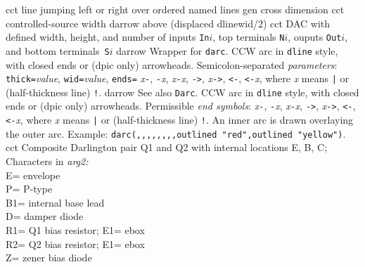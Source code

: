  {cct}%
  {line jumping left or right over ordered named lines}%
%
  {gen}%
  {cross dimension}%
%
  {cct}%
  {controlled-source width}%
%
%
  {darrow}%
  {above (displaced dlinewid/2)}%
%
  {cct}%
  {DAC with defined width, height, and number of inputs {\tt In$i$},
    top terminals {\tt N$i$}, ouputs {\tt Out$i$},
    and bottom terminals~{\tt S$i$} }%
%
  {darrow}%
  {Wrapper for {\tt darc}.
   CCW arc in {\tt dline} style, with closed ends or (dpic only) arrowheads.
  Semicolon-separated {\sl parameters}:
  {\tt thick=}{\sl value}, {\tt wid=}{\sl value}, {\tt ends=}%
  {\sl x}{\tt -},
  {\tt -}{\sl x}, {\sl x}{\tt -}{\sl x}, {\tt ->}, {\sl x}{\tt ->},
  {\tt <-}, {\tt <-}{\sl x}, {\tt <->}%
  where {\sl x} means {\tt |} or (half-thickness line) {\tt !}.}%
%
  {darrow}%
  {See also {\tt Darc}.
   CCW arc in {\tt dline} style, with closed ends or (dpic only) arrowheads.
  Permissible {\sl end symbols}:
  {\sl x}{\tt -},
  {\tt -}{\sl x}, {\sl x}{\tt -}{\sl x}, {\tt ->}, {\sl x}{\tt ->},
  {\tt <-}, {\tt <-}{\sl x}, {\tt <->}%
  where {\sl x} means {\tt |} or (half-thickness line) {\tt !}.
  An inner arc is drawn overlaying the outer arc.
  Example: {\tt darc(,{,},{,},{,},{,}outlined "red",outlined "yellow")}.}%
%
  {cct}%
  {Composite Darlington pair Q1 and Q2 with internal locations E, B, C;
   Characters in {\sl arg2:}\\
   E= envelope\\
   P= P-type\\
   B1= internal base lead\\
   D= damper diode\\
   R1= Q1 bias resistor; E1= ebox\\
   R2= Q2 bias resistor; E1= ebox\\
   Z= zener bias diode 
    }%
%

